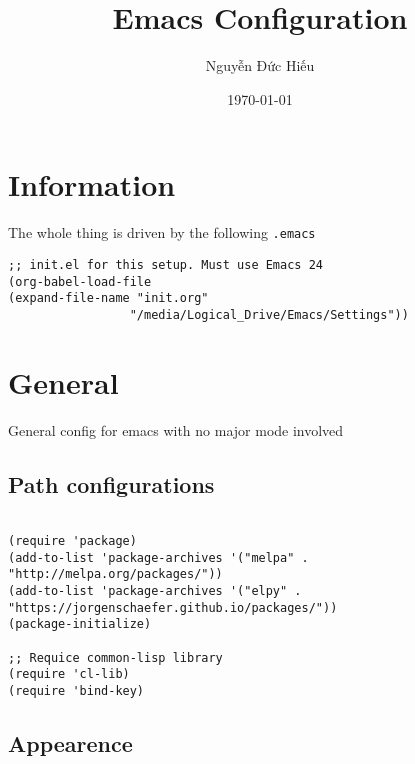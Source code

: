 \documentclass[11pt]{article}
\author{Nguyễn Đức Hiếu}
\date{\today}
\title{Emacs Configuration}
\begin{document}
\maketitle

\section{Information}
\label{sec:orgf72aa21}

The whole thing is driven by the following \texttt{.emacs}

\begin{verbatim}
;; init.el for this setup. Must use Emacs 24
(org-babel-load-file
(expand-file-name "init.org"
                 "/media/Logical_Drive/Emacs/Settings"))

\end{verbatim}

\section{General}
\label{sec:orgda3613a}
General config for emacs with no major mode involved
\subsection{Path configurations}
\label{sec:orgdf484df}

\begin{verbatim}

(require 'package)
(add-to-list 'package-archives '("melpa" . "http://melpa.org/packages/"))
(add-to-list 'package-archives '("elpy" . "https://jorgenschaefer.github.io/packages/"))
(package-initialize)

;; Requice common-lisp library
(require 'cl-lib)
(require 'bind-key)
\end{verbatim}

\subsection{Appearence}
\label{sec:org041d096}
\end{document}

